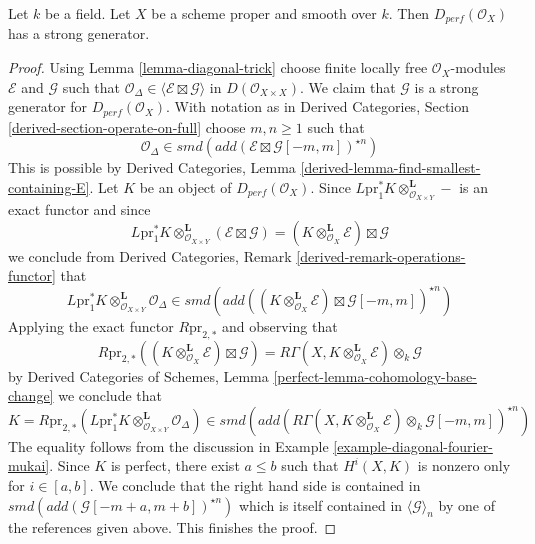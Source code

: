 \begin{lemma}
\label{lemma-smooth-proper-strong-generator}
Let $k$ be a field. Let $X$ be a scheme proper and smooth over $k$.
Then $D_{perf}(\mathcal{O}_X)$
has a strong generator.
\end{lemma}

\begin{proof}
Using Lemma \ref{lemma-diagonal-trick} choose finite locally free
$\mathcal{O}_X$-modules $\mathcal{E}$ and $\mathcal{G}$ such that
$\mathcal{O}_\Delta \in \langle \mathcal{E} \boxtimes \mathcal{G} \rangle$
in $D(\mathcal{O}_{X \times X})$. We claim that $\mathcal{G}$
is a strong generator for $D_{perf}(\mathcal{O}_X)$. With notation as in
Derived Categories, Section \ref{derived-section-operate-on-full}
choose $m, n \geq 1$ such that
$$
\mathcal{O}_\Delta \in
smd(add(\mathcal{E} \boxtimes \mathcal{G}[-m, m])^{\star n})
$$
This is possible by Derived Categories, Lemma
\ref{derived-lemma-find-smallest-containing-E}.
Let $K$ be an object of $D_{perf}(\mathcal{O}_X)$. Since
$L\text{pr}_1^*K \otimes_{\mathcal{O}_{X \times Y}}^\mathbf{L} -$
is an exact functor and since
$$
L\text{pr}_1^*K \otimes_{\mathcal{O}_{X \times Y}}^\mathbf{L}
(\mathcal{E} \boxtimes \mathcal{G}) =
(K \otimes_{\mathcal{O}_X}^\mathbf{L} \mathcal{E}) \boxtimes \mathcal{G}
$$
we conclude from
Derived Categories, Remark \ref{derived-remark-operations-functor} that
$$
L\text{pr}_1^*K
\otimes_{\mathcal{O}_{X \times Y}}^\mathbf{L}
\mathcal{O}_\Delta
\in
smd(add(
(K \otimes_{\mathcal{O}_X}^\mathbf{L} \mathcal{E})
\boxtimes \mathcal{G}[-m, m])^{\star n})
$$
Applying the exact functor $R\text{pr}_{2, *}$ and observing that
$$
R\text{pr}_{2, *}
\left((K \otimes_{\mathcal{O}_X}^\mathbf{L} \mathcal{E}) \boxtimes
\mathcal{G}\right) =
R\Gamma(X, K \otimes_{\mathcal{O}_X}^\mathbf{L} \mathcal{E})
\otimes_k \mathcal{G}
$$
by Derived Categories of Schemes, Lemma
\ref{perfect-lemma-cohomology-base-change} we conclude that
$$
K = R\text{pr}_{2, *}(L\text{pr}_1^*K
\otimes_{\mathcal{O}_{X \times Y}}^\mathbf{L} \mathcal{O}_\Delta)
\in
smd(add(R\Gamma(X, K \otimes_{\mathcal{O}_X}^\mathbf{L} \mathcal{E})
\otimes_k \mathcal{G}[-m, m])^{\star n})
$$
The equality follows from the discussion in
Example \ref{example-diagonal-fourier-mukai}.
Since $K$ is perfect, there exist $a \leq b$ such that
$H^i(X, K)$ is nonzero only for $i \in [a, b]$. We conclude that
the right hand side is contained in
$smd(add(\mathcal{G}[-m + a, m + b])^{\star n})$ which is
itself contained in $\langle \mathcal{G} \rangle_n$ by one of the
references given above. This finishes the proof.
\end{proof}

